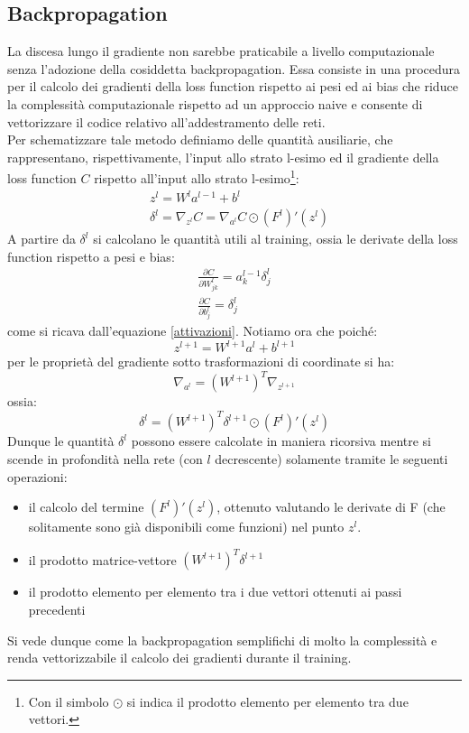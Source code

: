 \documentclass[a4paper]{article}
\begin{document}
\subsection{Backpropagation} 
La discesa lungo il gradiente non sarebbe praticabile a livello computazionale senza l'adozione della cosiddetta backpropagation. Essa consiste in una procedura per il calcolo dei gradienti della loss function rispetto ai pesi ed ai bias che riduce la complessità computazionale rispetto ad un approccio naive e consente di vettorizzare il codice relativo all'addestramento delle reti.\\
Per schematizzare tale metodo definiamo delle quantità ausiliarie, che rappresentano, rispettivamente, l'input allo strato l-esimo ed il gradiente della loss function $C$ rispetto all'input allo strato l-esimo\footnote{Con il simbolo $\odot$ si indica il prodotto elemento per elemento tra due vettori.}:
\begin{align}
&z^l = W^l a^{l-1} + b^l \\
&\delta^l = \nabla_{z^l} C = \nabla_{a^l} C \odot (F^l)'(z^l)
\end{align}
A partire da $\delta^l$ si calcolano le quantità utili al training, ossia le derivate della loss function rispetto a pesi e bias:
\begin{align}
\frac{\partial C}{\partial W_{jk}^l} = a_k^{l-1} \delta_j^l\\
\frac{\partial C}{\partial b^l_j} = \delta_j^l
\end{align}
come si ricava dall'equazione \eqref{attivazioni}.
Notiamo ora che poiché:
\begin{equation}
z^{l+1} = W^{l+1} a^l+b^{l+1}
\end{equation}
per le proprietà del gradiente sotto trasformazioni di coordinate si ha:
\begin{equation}
\nabla_{a^l} = (W^{l+1})^T \nabla_{z^{l+1}} 
\end{equation}
ossia:
\begin{equation}
\delta^l =(W^{l+1})^T \delta^{l+1} \odot (F^l)'(z^l)
\end{equation}
Dunque le quantità $\delta^l$ possono essere calcolate in maniera ricorsiva mentre si scende in profondità nella rete (con $l$ decrescente) solamente tramite le seguenti operazioni:
\begin{itemize}
\item il calcolo del termine $(F^l)'(z^l)$, ottenuto valutando le derivate di F (che solitamente sono già disponibili come funzioni) nel punto $z^l$.
\item il prodotto matrice-vettore $(W^{l+1})^T \delta^{l+1}$
\item il prodotto elemento per elemento tra i due vettori ottenuti ai passi precedenti
\end{itemize}
Si vede dunque come la backpropagation semplifichi di molto la complessità e renda vettorizzabile il calcolo dei gradienti durante il training.\cite{nielsenneural}
\end{document}
